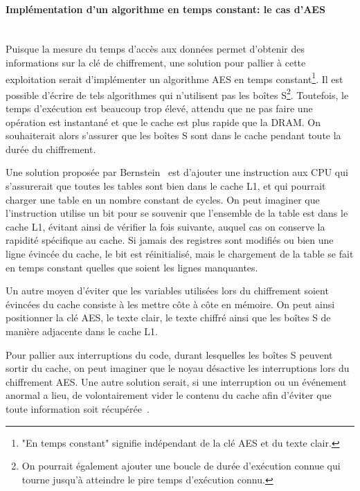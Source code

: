 \documentclass[a4paper,11pt]{article}
\begin{document}
\paragraph{Implémentation d'un algorithme en temps constant: le cas d'AES} ~\\
Puisque la mesure du temps d'accès aux données permet d'obtenir des informations sur la clé de chiffrement, une solution pour pallier à cette exploitation serait d'implémenter un algorithme AES en temps constant\footnote{"En temps constant" signifie indépendant de la clé AES et du texte clair.}. Il est possible d'écrire de tels algorithmes qui n'utilisent pas les boîtes S\footnote{On pourrait également ajouter une boucle de durée d'exécution connue qui tourne jusqu'à atteindre le pire temps d'exécution connu.}. Toutefois, le temps d'exécution est beaucoup trop élevé, attendu que ne pas faire une opération est instantané et que le cache est plus rapide que la DRAM.
On souhaiterait alors s'assurer que les boîtes S sont dans le cache pendant toute la durée du chiffrement.

Une solution proposée par Bernstein~\cite{bernstein2005cache} est d'ajouter une instruction aux CPU qui s'assurerait que toutes les tables sont bien dans le cache L1, et qui pourrait charger une table en un nombre constant de cycles. On peut imaginer que l'instruction utilise un bit pour se souvenir que l'ensemble de la table est dans le cache L1, évitant ainsi de vérifier la fois suivante, auquel cas on conserve la rapidité spécifique au cache. Si jamais des registres sont modifiés ou bien une ligne évincée du cache, le bit est réinitialisé, mais le chargement de la table se fait en temps constant quelles que soient les lignes manquantes.

Un autre moyen d'éviter que les variables utilisées lors du chiffrement soient évincées du cache consiste à les mettre côte à côte en mémoire. On peut ainsi positionner la clé AES, le texte clair, le texte chiffré ainsi que les boîtes S de manière adjacente dans le cache L1.

Pour pallier aux interruptions du code, durant lesquelles les boîtes S peuvent sortir du cache, on peut imaginer que le noyau désactive les interruptions lors du chiffrement AES. Une autre solution serait, si une interruption ou un événement anormal a lieu, de volontairement vider le contenu du cache afin d'éviter que toute information soit récupérée~\cite{canteaut2006understanding}.


\end{document}
